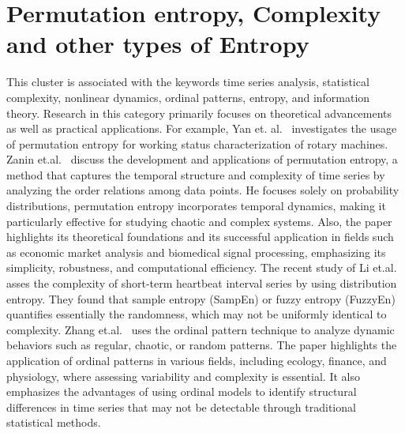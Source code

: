 \section{Permutation entropy, Complexity and other types of Entropy}\label{Sec:ReviewTopicPE}
This cluster is associated with the keywords time series analysis, statistical complexity, nonlinear dynamics, ordinal patterns, entropy, and information theory. Research in this category primarily focuses on theoretical advancements as well as practical applications. For example, Yan et. al.~\cite{Yan2012} investigates the usage of permutation entropy for working status characterization of rotary machines. Zanin et.al.~\cite{Zanin2012}  discuss the development and applications of permutation entropy, a method that captures the temporal structure and complexity of time series by analyzing the order relations among data points. He focuses solely on probability distributions, permutation entropy incorporates temporal dynamics, making it particularly effective for studying chaotic and complex systems. Also, the paper highlights its theoretical foundations and its successful application in fields such as economic market analysis and biomedical signal processing, emphasizing its simplicity, robustness, and computational efficiency. The recent study of Li et.al.~\cite{Li2015e} asses the complexity of short-term heartbeat interval series by using distribution entropy. They found that sample entropy (SampEn) or fuzzy entropy (FuzzyEn) quantifies essentially the randomness, which may not be uniformly identical to complexity. Zhang et.al.~\cite{Zhang2018d} uses the ordinal pattern technique to analyze dynamic behaviors such as regular, chaotic, or random patterns. The paper highlights the application of ordinal patterns in various fields, including ecology, finance, and physiology, where assessing variability and complexity is essential. It also emphasizes the advantages of using ordinal models to identify structural differences in time series that may not be detectable through traditional statistical methods.

